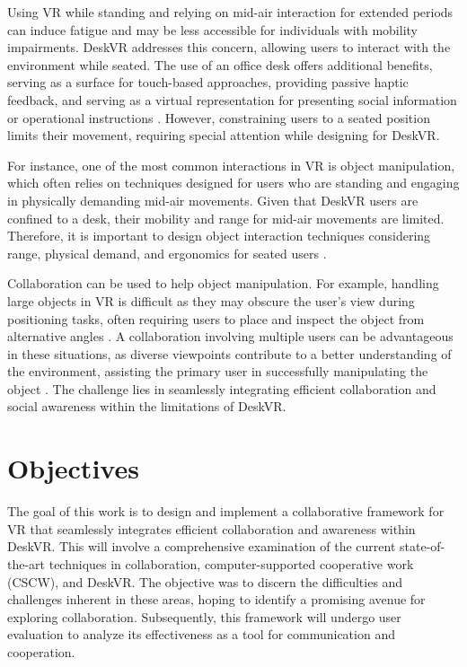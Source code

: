 Using VR while standing and relying on mid-air interaction for extended periods can induce fatigue and may be less accessible for individuals with mobility impairments. DeskVR addresses this concern, allowing users to interact with the environment while seated. The use of an office desk offers additional benefits, serving as a surface for touch-based approaches, providing passive haptic feedback, and serving as a virtual representation for presenting social information or operational instructions \cite{zielaskoMenusDeskSystem2019, sousaVRRRRoomVirtualReality2017}. However, constraining users to a seated position limits their movement, requiring special attention while designing for DeskVR.

For instance, one of the most common interactions in VR is object manipulation, which often relies on techniques designed for users who are standing and engaging in physically demanding mid-air movements. Given that DeskVR users are confined to a desk, their mobility and range for mid-air movements are limited. Therefore, it is important to design object interaction techniques considering range, physical demand, and ergonomics for seated users \cite{almeidaSIT6IndirectTouchbased2023}.

Collaboration can be used to help object manipulation. For example, handling large objects in VR is difficult as they may obscure the user's view during positioning tasks, often requiring users to place and inspect the object from alternative angles \cite{bowmanEvaluationTechniquesGrabbing1997}. A collaboration involving multiple users can be advantageous in these situations, as diverse viewpoints contribute to a better understanding of the environment, assisting the primary user in successfully manipulating the object \cite{pinhoCooperativeObjectManipulation2008}. The challenge lies in seamlessly integrating efficient collaboration and social awareness within the limitations of DeskVR.

\section{Objectives}

The goal of this work is to design and implement a collaborative framework for VR that seamlessly integrates efficient collaboration and awareness within DeskVR. This will involve a comprehensive examination of the current state-of-the-art techniques in collaboration, computer-supported cooperative work (CSCW), and DeskVR. The objective was to discern the difficulties and challenges inherent in these areas, hoping to identify a promising avenue for exploring collaboration. Subsequently, this framework will undergo user evaluation to analyze its effectiveness as a tool for communication and cooperation.

